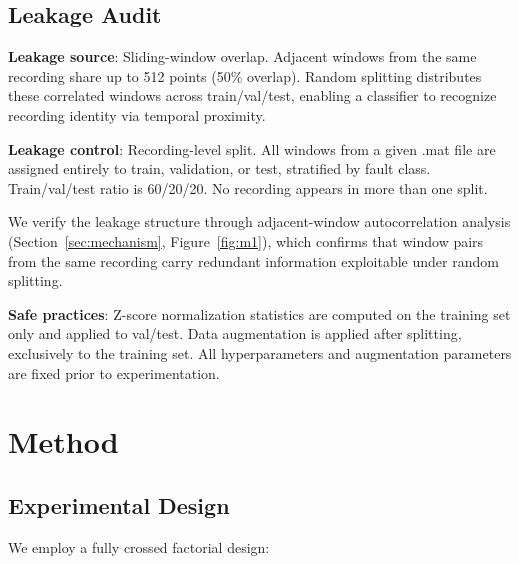 ﻿\documentclass[11pt,a4paper]{article}
\begin{document}
\subsection{Leakage Audit}

\textbf{Leakage source}: Sliding-window overlap. Adjacent windows from the same recording share up to 512 points (50\% overlap). Random splitting distributes these correlated windows across train/val/test, enabling a classifier to recognize recording identity via temporal proximity.

\textbf{Leakage control}: Recording-level split. All windows from a given .mat file are assigned entirely to train, validation, or test, stratified by fault class. Train/val/test ratio is 60/20/20. No recording appears in more than one split.

We verify the leakage structure through adjacent-window autocorrelation analysis (Section~\ref{sec:mechanism}, Figure~\ref{fig:m1}), which confirms that window pairs from the same recording carry redundant information exploitable under random splitting.

\textbf{Safe practices}: Z-score normalization statistics are computed on the training set only and applied to val/test. Data augmentation is applied after splitting, exclusively to the training set. All hyperparameters and augmentation parameters are fixed prior to experimentation.

\section{Method}

\subsection{Experimental Design}

We employ a fully crossed factorial design:
\end{document}
